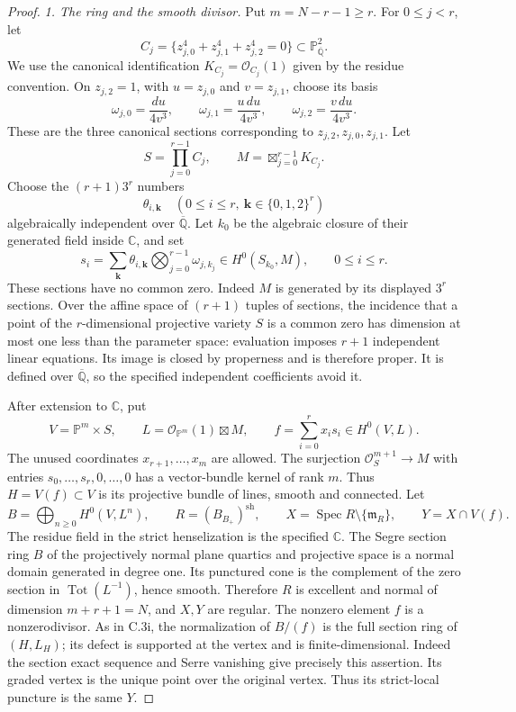 \begin{proof}
\emph{1. The ring and the smooth divisor.}
Put $m=N-r-1\ge r$. For $0\le j<r$, let
\[
 C_j=\{z_{j,0}^4+z_{j,1}^4+z_{j,2}^4=0\}
          \subset\mathbb P^2_{\overline{\mathbb Q}}.
\]
We use the canonical identification $K_{C_j}=\mathcal O_{C_j}(1)$
given by the residue convention. On $z_{j,2}=1$, with
$u=z_{j,0}$ and $v=z_{j,1}$, choose its basis
\[
 \omega_{j,0}=\frac{du}{4v^3},\qquad
 \omega_{j,1}=\frac{u\,du}{4v^3},\qquad
 \omega_{j,2}=\frac{v\,du}{4v^3}.
\]
These are the three canonical sections corresponding to
$z_{j,2},z_{j,0},z_{j,1}$. Let
\[
 S=\prod_{j=0}^{r-1}C_j,\qquad
 M=\boxtimes_{j=0}^{r-1}K_{C_j}.
\]
Choose the $(r+1)3^r$ numbers
\[
 \theta_{i,\mathbf k}\quad
 (0\le i\le r,\ \mathbf k\in\{0,1,2\}^{r})
\]
algebraically independent over $\overline{\mathbb Q}$.
Let $k_0$ be the algebraic closure of their generated
field inside $\mathbb C$, and set
\[
 s_i=\sum_{\mathbf k}\theta_{i,\mathbf k}
                 \bigotimes_{j=0}^{r-1}\omega_{j,k_j}
       \in H^0(S_{k_0},M),\qquad 0\le i\le r.
\]
These sections have no common zero. Indeed $M$ is generated
by its displayed $3^r$ sections. Over the affine space of
$(r+1)$ tuples of sections, the incidence that a point of
the $r$-dimensional projective variety $S$ is a common zero
has dimension at most one less than the parameter space:
evaluation imposes $r+1$ independent linear equations.
Its image is closed by properness and is therefore proper.
It is defined over $\overline{\mathbb Q}$, so the specified
independent coefficients avoid it.

After extension to $\mathbb C$, put
\[
 V=\mathbb P^m\times S,\qquad
 L=\mathcal O_{\mathbb P^m}(1)\boxtimes M,\qquad
 f=\sum_{i=0}^{r}x_i s_i\in H^0(V,L).
\]
The unused coordinates $x_{r+1},\ldots,x_m$ are allowed.
The surjection $\mathcal O_S^{m+1}\to M$ with entries
$s_0,\ldots,s_r,0,\ldots,0$ has a vector-bundle kernel
of rank $m$. Thus $H=V(f)\subset V$ is its projective
bundle of lines, smooth and connected. Let
\[
 B=\bigoplus_{n\ge0}H^0(V,L^n),\qquad
 R=(B_{B_+})^{\mathrm{sh}},\qquad
 X=\operatorname{Spec}R\setminus\{\mathfrak m_R\},\qquad
 Y=X\cap V(f).
\]
The residue field in the strict henselization is the
specified $\mathbb C$. The Segre section ring $B$ of the
projectively normal plane quartics and projective space
is a normal domain generated in degree one. Its punctured
cone is the complement of the zero section in
$\operatorname{Tot}(L^{-1})$, hence smooth. Therefore $R$
is excellent and normal of dimension $m+r+1=N$, and
$X,Y$ are regular. The nonzero element $f$ is a
nonzerodivisor. As in C.3i, the normalization of $B/(f)$
is the full section ring of $(H,L_H)$; its defect is
supported at the vertex and is finite-dimensional.
Indeed the section exact sequence and Serre vanishing
give precisely this assertion. Its graded vertex is
the unique point over the original vertex. Thus its
strict-local puncture is the same $Y$.


\end{proof}
